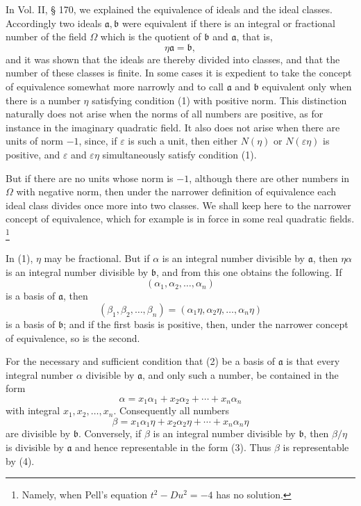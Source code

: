 \documentclass[11pt]{article}
\begin{document}
In Vol. II, § 170, we explained the equivalence of ideals and the ideal classes. Accordingly two ideals $\mathfrak a,\mathfrak b$ were equivalent if there is an integral or fractional number of the field $\Omega$ which is the quotient of $\mathfrak b$ and $\mathfrak a$, that is,
\begin{equation}
 \eta\mathfrak a=\mathfrak b,\tag{1}
\end{equation}
and it was shown that the ideals are thereby divided into classes, and that the number of these classes is finite. In some cases it is expedient to take the concept of equivalence somewhat more narrowly and to call $\mathfrak a$ and $\mathfrak b$ equivalent only when there is a number $\eta$ satisfying condition (1) with positive norm. This distinction naturally does not arise when the norms of all numbers are positive, as for instance in the imaginary quadratic field. It also does not arise when there are units of norm $-1$, since, if $\varepsilon$ is such a unit, then either $N(\eta)$ or $N(\varepsilon\eta)$ is positive, and $\varepsilon$ and $\varepsilon\eta$ simultaneously satisfy condition (1).

But if there are no units whose norm is $-1$, although there are other numbers in $\Omega$ with negative norm, then under the narrower definition of equivalence each ideal class divides once more into two classes. We shall keep here to the narrower concept of equivalence, which for example is in force in some real quadratic fields.
\footnote{Namely, when Pell's equation $t^2-Du^2=-4$ has no solution.}

In (1), $\eta$ may be fractional. But if $\alpha$ is an integral number divisible by $\mathfrak a$, then $\eta\alpha$ is an integral number divisible by $\mathfrak b$, and from this one obtains the following. If
\begin{equation}
 (\alpha_1,\alpha_2,
\ldots,\alpha_n)\tag{2}
\end{equation}
is a basis of $\mathfrak a$, then
\[
 (\beta_1,\beta_2,
\ldots,\beta_n)=(\alpha_1\eta,\alpha_2\eta,
\ldots,\alpha_n\eta)
\]
is a basis of $\mathfrak b$; and if the first basis is positive, then, under the narrower concept of equivalence, so is the second.

For the necessary and sufficient condition that (2) be a basis of $\mathfrak a$ is that every integral number $\alpha$ divisible by $\mathfrak a$, and only such a number, be contained in the form
\begin{equation}
 \alpha=x_1\alpha_1+x_2\alpha_2+\cdots+x_n\alpha_n\tag{3}
\end{equation}
with integral $x_1,x_2,
\ldots,x_n$. Consequently all numbers
\begin{equation}
 \beta=x_1\alpha_1\eta+x_2\alpha_2\eta+\cdots+x_n\alpha_n\eta\tag{4}
\end{equation}
are divisible by $\mathfrak b$. Conversely, if $\beta$ is an integral number divisible by $\mathfrak b$, then $\beta/\eta$ is divisible by $\mathfrak a$ and hence representable in the form (3). Thus $\beta$ is representable by (4).
\end{document}
